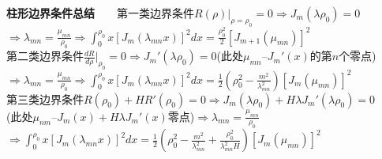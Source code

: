 \documentclass[10pt,a4paper]{article}
\begin{document}
\begin{multicols}{2}
\textbf{柱形边界条件总结}~~~~第一类边界条件$R(\rho)|_{\rho=\rho_0}=0\Longrightarrow J_m(\lambda\rho_0)=0$\\
\indent$\Longrightarrow\lambda_{mn}=\frac{\mu_{mn}}{\rho_0}\Longrightarrow\int_0^{\rho_0}x[J_m(\lambda_{mn}x)]^2dx=\frac{\rho_0^2}{2}[J_{m+1}(\mu_{mn})]^2$\\
第二类边界条件$\frac{dR}{d\rho}|_{\rho_0}=0\Longrightarrow J_m'(\lambda\rho_0)=0$(此处$\mu_{mn}$--$J_m'(x)$的第$n$个零点)\\
\indent$\Longrightarrow\lambda_{mn}=\frac{\mu_{mn}}{\rho_0}\Longrightarrow\int_0^{\rho_0}x[J_m(\lambda_{mn}x)]^2dx=\frac{1}{2}(\rho_0^2-\frac{m^2}{\lambda_{mn}^2})[J_m(\mu_{mn})]^2$\\
第三类边界条件$R(\rho_0)+HR'(\rho_0)=0\Longrightarrow J_m(\lambda\rho_0)+H\lambda J_m'(\lambda\rho_0)=0$\\
\indent(此处$\mu_{nm}$--$J_m(x)+H\lambda J_m'(x)$零点)$\Longrightarrow\lambda_{mn}=\frac{\mu_{mn}}{\rho_0}$\\
\indent$\Longrightarrow\int_0^{\rho_0}x[J_m(\lambda_{mn}x)]^2dx=\frac{1}{2}(\rho_0^2-\frac{m^2}{\lambda_{mn}^2}+\frac{\rho_0^2}{\lambda_{mn}^2H})[J_m(\mu_{mn})]^2$
\end{multicols}
\end{document}
